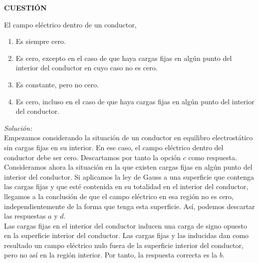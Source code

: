 \textbf{CUESTIÓN}
\vspace{20px}

El campo eléctrico dentro de un conductor,

\begin{enumerate}[label=\alph*.]
    \item Es siempre cero.
    \item Es cero, excepto en el caso de que haya cargas fijas en algún punto del interior del conductor en cuyo caso
    no es cero.
    \item Es constante, pero no cero.
    \item Es cero, incluso en el caso de que haya cargas fijas en algún punto del interior del conductor.
\end{enumerate}

\vspace{20px}
\textit{Solución:}
\\

Empezamos considerando la situación de un conductor en equilibro electrostático sin cargas fijas en su interior. En ese caso,
el campo eléctrico dentro del conductor debe ser cero. Descartamos por tanto la opción $c$ como respuesta.\\

Consideramos ahora la situación en la que existen cargas fijas en algún punto del interior del conductor. Si aplicamos la ley de Gauss a una superficie
que contenga las cargas fijas y que esté contenida en su totalidad en el interior del conductor,  llegamos a la conclusión de
que el campo eléctrico en esa región no es cero, independientemente de la forma
que tenga esta superficie. Así, podemos descartar las respuestas $a$ y $d$.\\

Las cargas fijas en el interior del conductor inducen una carga de signo opuesto en la superficie interior del conductor.
Las cargas fijas y las inducidas dan como resultado un campo eléctrico nulo fuera de la superficie interior del conductor, pero
no así en la región interior. Por tanto, la respuesta correcta es la $b$.






